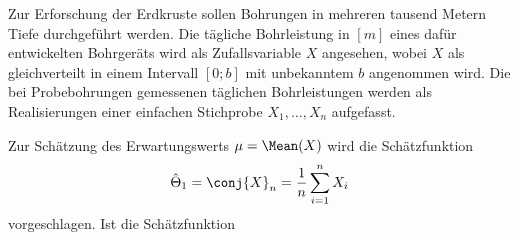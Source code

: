 \documentclass{abgabe}
\begin{document}
\begin{questions}
    \question
    Zur Erforschung der Erdkruste sollen Bohrungen in mehreren tausend Metern Tiefe durchgeführt werden. 
    Die tägliche Bohrleistung in $[m]$ eines dafür entwickelten Bohrgeräts wird als Zufallsvariable $X$ angesehen, wobei $X$ als gleichverteilt in einem Intervall $[0; b]$ mit unbekanntem $b$ angenommen wird. 
    Die bei Probebohrungen gemessenen täglichen Bohrleistungen werden als Realisierungen einer einfachen Stichprobe $X_1,\ldots,X_n$ aufgefasst.
    
    Zur Schätzung des Erwartungswerts $\mu = \Mean(X)$ wird die Schätzfunktion 
    \[ 
        \hat{\Theta}_1 = \conj{X}_n = \frac{1}{n} \sum^n_{i=1} X_i
    \]
    vorgeschlagen. Ist die Schätzfunktion
\end{questions}
\end{document}

